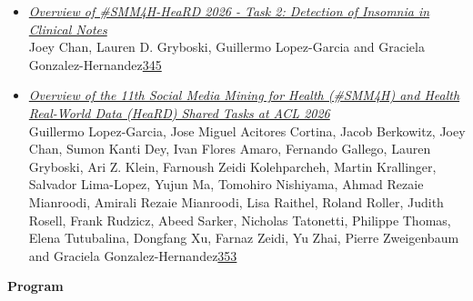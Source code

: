 \documentclass[11pt,oneside]{book}
\begin{document}
\begin{itemize}[leftmargin=*,label={}]
       \item \hyperlink{page.345}{\emph{Overview of \#SMM4H-HeaRD 2026 - Task 2: Detection of Insomnia in Clinical Notes}}\\ \hspace*{2em} Joey Chan, Lauren D. Gryboski, Guillermo Lopez-Garcia and Graciela Gonzalez-Hernandez\dotfill \hyperlink{page.345}{345}
       \item \hyperlink{page.353}{\emph{Overview of the 11th Social Media Mining for Health (\#SMM4H) and Health Real-World Data (HeaRD) Shared Tasks at ACL 2026}}\\ \hspace*{2em} Guillermo Lopez-Garcia, Jose Miguel Acitores Cortina, Jacob Berkowitz, Joey Chan, Sumon Kanti Dey, Ivan Flores Amaro, Fernando Gallego, Lauren Gryboski, Ari Z. Klein, Farnoush Zeidi Kolehparcheh, Martin Krallinger, Salvador Lima-Lopez, Yujun Ma, Tomohiro Nishiyama, Ahmad Rezaie Mianroodi, Amirali Rezaie Mianroodi, Lisa Raithel, Roland Roller, Judith Rosell, Frank Rudzicz, Abeed Sarker, Nicholas Tatonetti, Philippe Thomas, Elena Tutubalina, Dongfang Xu, Farnaz Zeidi, Yu Zhai, Pierre Zweigenbaum and Graciela Gonzalez-Hernandez\dotfill \hyperlink{page.353}{353}
  \end{itemize}
\newpage

{}
\renewcommand{\baselinestretch}{0.87}
\setlength{\parindent}{0in}
\setlength{\parskip}{2ex}

\begin{center}
{\Large \textbf{Program}}
\end{center}
\vspace*{0.5em}
\end{document}
